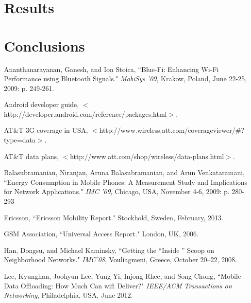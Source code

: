 \documentclass[12pt, fleqn]{article}
\begin{document}
\section{Results}


\section{Conclusions}


\newpage
\begin{thebibliography}{9}
    Ananthanarayanan, Ganesh, and Ion Stoica,
    ``Blue-Fi: Enhancing Wi-Fi Performance using Bluetooth Signals."
    \emph{MobiSys '09}, 
    Krakow, Poland,
    June 22-25, 2009:
    p. 249-261.
  
    Android developer guide,
    $<$http://developer.android.com/reference/packages.html$>$.
  
    AT&T 3G coverage in USA,
    $<$http://www.wireless.att.com/coverageviewer/#?type=data$>$.
  
    AT&T data plans, 
    $<$http://www.att.com/shop/wireless/data-plans.html$>$.
    
    Balasubramanian, Niranjan, Aruna Balasubramanian, and Arun Venkataramani,
    ``Energy Consumption in Mobile Phones: A Measurement Study and Implications for Network 
    Applications."
    \emph{IMC '09},
    Chicago, USA,
    November 4-6, 2009:
    p. 280-293
    
    Ericsson,
    ``Ericsson Mobility Report."
    Stockhold, Sweden,
    February, 2013.
    
    GSM Association, 
    ``Universal Access Report."
    London, UK,
    2006.
    
    Han, Dongsu, and Michael Kaminsky,
    ``Getting the “Inside ” Scoop on Neighborhood Networks."
    \emph{IMC’08}, 
    Vouliagmeni, Greece,
    October 20–22, 2008.     
    
    Lee, Kyunghan, Joohyun Lee, Yung Yi, Injong Rhee, and Song Chong, 
    ``Mobile Data Offloading: How Much Can wifi Deliver?"
    \emph{IEEE/ACM Transactions on Networking}, 
    Philadelphia, USA,
    June 2012.
    

\end{thebibliography}
\end{document}
